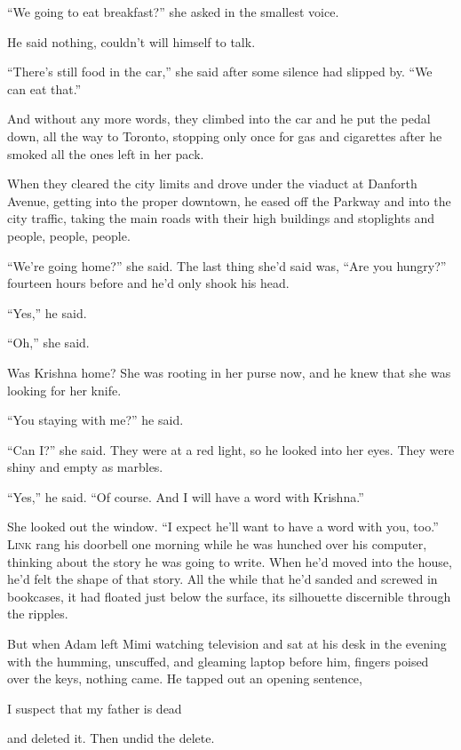 \documentclass{article}
\begin{document}
``We going to eat breakfast?'' she asked in the smallest voice.

He said nothing, couldn't will himself to talk.

``There's still food in the car,'' she said after some silence had
slipped by.  ``We can eat that.''

And without any more words, they climbed into the car and he put the
pedal down, all the way to Toronto, stopping only once for gas and
cigarettes after he smoked all the ones left in her pack.

When they cleared the city limits and drove under the viaduct at
Danforth Avenue, getting into the proper downtown, he eased off the
Parkway and into the city traffic, taking the main roads with their
high buildings and stoplights and people, people, people.

``We're going home?'' she said.  The last thing she'd said was, ``Are
you hungry?'' fourteen hours before and he'd only shook his head.

``Yes,'' he said.

``Oh,'' she said.

Was Krishna home?  She was rooting in her purse now, and he knew that
she was looking for her knife.

``You staying with me?'' he said.

``Can I?'' she said.  They were at a red light, so he looked into her
eyes.  They were shiny and empty as marbles.

``Yes,'' he said.  ``Of course.  And I will have a word with
Krishna.''

She looked out the window.  ``I expect he'll want to have a word with
you, too.''
\\
\lettrine[lines=3, lhang=.5, nindent=0pt, findent=2pt]{L}{ink} rang his doorbell one morning while he was hunched over his
computer, thinking about the story he was going to write.  When he'd
moved into the house, he'd felt the shape of that story.  All the
while that he'd sanded and screwed in bookcases, it had floated just
below the surface, its silhouette discernible through the ripples.

But when Adam left Mimi watching television and sat at his desk in the
evening with the humming, unscuffed, and gleaming laptop before him,
fingers poised over the keys, nothing came.  He tapped out an opening
sentence,

I suspect that my father is dead

and deleted it.  Then undid the delete.
\end{document}
